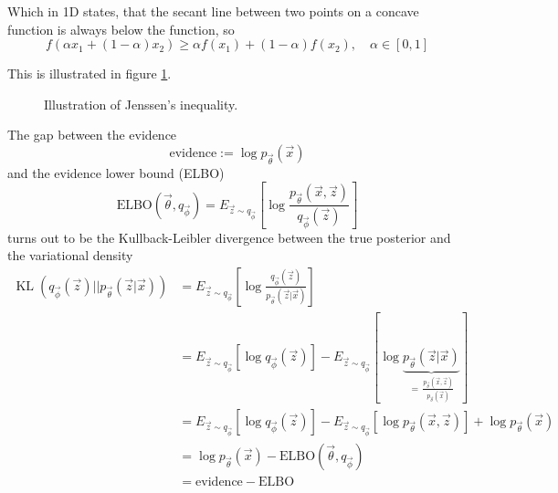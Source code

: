 Which in 1D states, that the secant line between two points on a concave function is always below the function, so
\begin{equation}
    f(\alpha x_1 + (1-\alpha) x_2) \geq \alpha f(x_1) + (1-\alpha) f(x_2), \quad \alpha \in [0,1]
\end{equation}

This is illustrated in figure \ref{fig:jenssen}.

\begin{figure}[H]
    \centering
    
    \caption{Illustration of Jenssen's inequality.}
    \label{fig:jenssen}
\end{figure}

The gap between the evidence
\begin{equation}
    \text{evidence} := \log p_\vec{\theta}(\vec{x})
\end{equation}
and the evidence lower bound (ELBO)
\begin{equation}
    \text{ELBO}(\vec{\theta}, q_{\vec{\phi}}) = E_{\vec{z} \sim q_{\vec{\phi}}} \left[ \log \frac{p_\vec{\theta}(\vec{x},\vec{z})}{q_{\vec{\phi}}(\vec{z})} \right]
\end{equation}
turns out to be the Kullback-Leibler divergence between the true posterior and the variational density
\begin{equation}
    \begin{aligned}
        \operatorname{KL}(q_{\vec{\phi}}(\vec{z}) || p_{\vec{\theta}}(\vec{z} | \vec{x})) &= E_{\vec{z} \sim q_{\vec{\phi}}} \left[ \log \frac{q_{\vec{\phi}}(\vec{z})}{p_{\vec{\theta}}(\vec{z} | \vec{x})} \right] \\
        &= E_{\vec{z} \sim q_{\vec{\phi}}} \left[ \log q_{\vec{\phi}}(\vec{z})\right] - E_{\vec{z} \sim q_{\vec{\phi}}} \left[ \log \underbrace{p_{\vec{\theta}}(\vec{z} | \vec{x})}_{=\, \frac{p_\vec{\theta}(\vec{x},\vec{z})}{p_\vec{\theta}(\vec{x})}} \right] \\
        &= E_{\vec{z} \sim q_{\vec{\phi}}} \left[ \log q_{\vec{\phi}}(\vec{z})\right] - E_{\vec{z} \sim q_{\vec{\phi}}} \left[ \log p_{\vec{\theta}}(\vec{x},\vec{z}) \right] + \log p_\vec{\theta}(\vec{x}) \\
        &= \log p_\vec{\theta}(\vec{x}) - \text{ELBO}(\vec{\theta}, q_{\vec{\phi}}) \\
        &= \text{evidence} - \text{ELBO}
    \end{aligned}
\end{equation}

